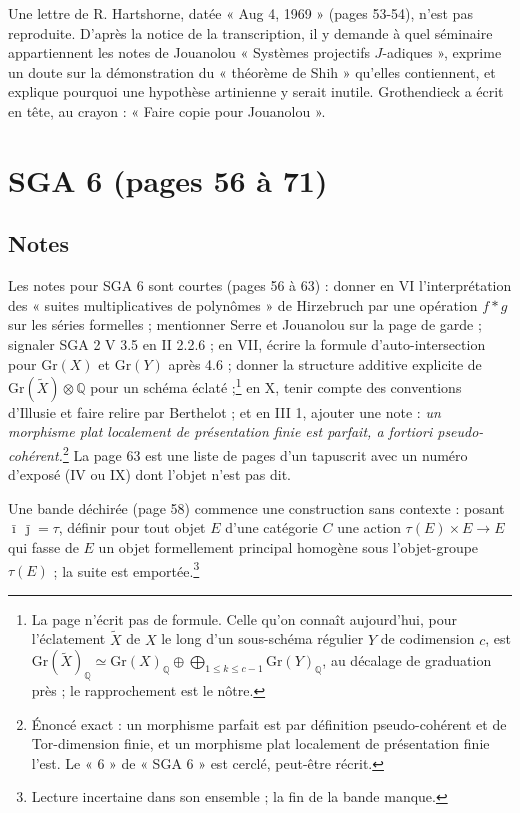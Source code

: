 \documentclass[11pt,a4paper]{article}
\begin{document}
Une lettre de R. Hartshorne, datée « Aug 4, 1969 » (pages 53-54), n'est pas
reproduite. D'après la notice de la transcription, il y demande à quel
séminaire appartiennent les notes de Jouanolou « Systèmes projectifs
$J$-adiques », exprime un doute sur la démonstration du « théorème de Shih »
qu'elles contiennent, et explique pourquoi une hypothèse artinienne y serait
inutile. Grothendieck a écrit en tête, au crayon : « Faire copie pour
Jouanolou ».

\section*{SGA 6 (pages 56 à 71)}

\subsection*{Notes}

Les notes pour SGA 6 sont courtes (pages 56 à 63) : donner en VI
l'interprétation des « suites multiplicatives de polynômes » de Hirzebruch
par une opération $f * g$ sur les séries formelles ; mentionner Serre et
Jouanolou sur la page de garde ; signaler SGA 2 V 3.5 en II 2.2.6 ; en VII,
écrire la formule d'auto-intersection pour $\mathrm{Gr}(X)$ et
$\mathrm{Gr}(Y)$ après 4.6 ; donner la structure additive explicite de
$\mathrm{Gr}(\widetilde{X}) \otimes \mathbb{Q}$ pour un schéma
éclaté ;\footnote{La page n'écrit pas de formule. Celle qu'on connaît
aujourd'hui, pour l'éclatement $\widetilde{X}$ de $X$ le long d'un
sous-schéma régulier $Y$ de codimension $c$, est
$\mathrm{Gr}(\widetilde{X})_{\mathbb{Q}} \simeq \mathrm{Gr}(X)_{\mathbb{Q}}
\oplus \bigoplus_{1 \le k \le c-1} \mathrm{Gr}(Y)_{\mathbb{Q}}$, au décalage
de graduation près ; le rapprochement est le nôtre.}
en X, tenir compte des conventions d'Illusie et faire relire par Berthelot ;
et en III 1, ajouter une note : \emph{un morphisme plat localement de
présentation finie est parfait, a fortiori pseudo-cohérent.}\footnote{Énoncé
exact : un morphisme parfait est par définition pseudo-cohérent et de
Tor-dimension finie, et un morphisme plat localement de présentation finie
l'est. Le « 6 » de « SGA 6 » est cerclé, peut-être récrit.}
La page 63 est une liste de pages d'un tapuscrit avec un numéro d'exposé (IV
ou IX) dont l'objet n'est pas dit.

Une bande déchirée (page 58) commence une construction sans contexte :
posant $\bar{\imath}\,\bar{\jmath} = \tau$, définir pour tout objet $E$ d'une
catégorie $C$ une action $\tau(E) \times E \to E$ qui fasse de $E$ un objet
formellement principal homogène sous l'objet-groupe $\tau(E)$ ; la suite est
emportée.\footnote{Lecture incertaine dans son ensemble ; la fin de la bande
manque.}
\end{document}

